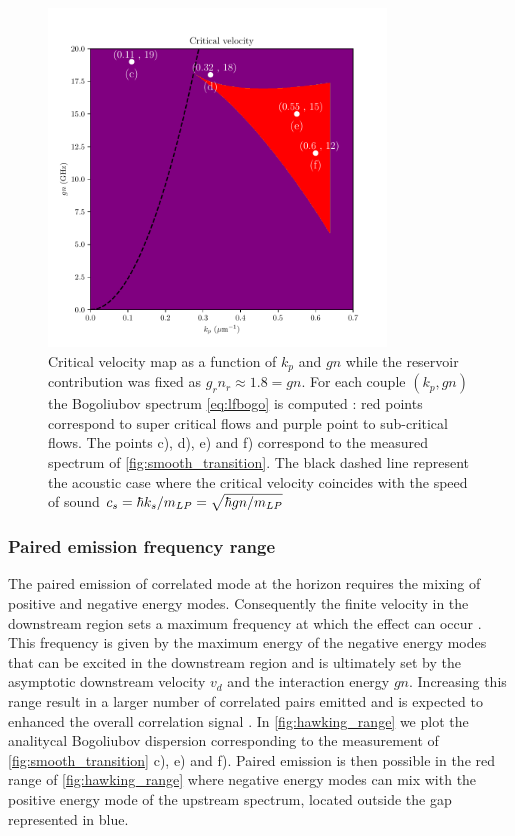 \begin{figure}
    \centering
    \includegraphics[width=0.8\textwidth]{chap_custom_st/fig/critical_velocity_map.pdf}
    \caption{Critical velocity map as a function of $k_p$ and $gn$ while the reservoir contribution was fixed as $g_rn_r\approx 1.8=gn$. For each couple $(k_p,gn)$ the Bogoliubov spectrum \autoref{eq:lfbogo} is computed : red points correspond to super critical flows and purple point to sub-critical flows.
    The points c), d), e) and f) correspond to the measured spectrum of \autoref{fig:smooth_transition}. The black dashed line represent the acoustic case where the critical velocity coincides with the speed of sound $c_s = \hbar k_s/m_{LP}=\sqrt{\hbar gn/m_{LP}}$ }
    \label{fig:critical_velocity_map}
\end{figure}

\subsubsection{Paired emission frequency range}

The paired emission of correlated mode at the horizon requires the mixing of positive and negative energy modes. Consequently the finite velocity in the downstream region 
sets a maximum frequency at which the effect can occur \cite{jacquet_hawking_2019}. This frequency is given by the maximum energy of the negative energy modes that can be excited in the downstream region and is ultimately 
set by the asymptotic downstream velocity $v_d$ and the interaction energy $gn$. Increasing this range result in a larger number of correlated pairs emitted and is expected to enhanced
the overall correlation signal \cite{jacquet_hawking_2019}. 
In \autoref{fig:hawking_range} we plot the analitycal Bogoliubov dispersion corresponding to the measurement of \autoref{fig:smooth_transition} c), e) and f).  Paired emission is then possible in the red range of \autoref{fig:hawking_range}  where negative energy modes
can mix with the positive energy mode of the upstream spectrum, located outside the gap represented in blue.

